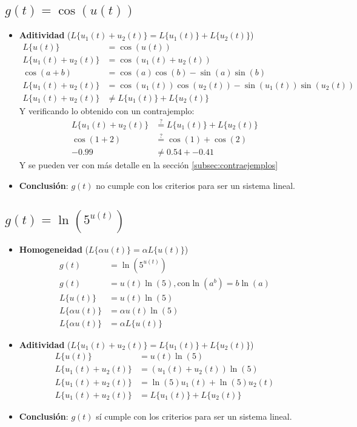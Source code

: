 \documentclass[12pt,a4paper]{article}
\begin{document}
\subsection{$g(t)=\cos(u(t))$}

\begin{itemize}
    \item \textbf{Aditividad} ($L\{u_1(t)+u_2(t)\}=L\{u_1(t)\}+ L\{u_2(t)\}$)
    \begin{align*}
        L\{u(t)\} &= \cos(u(t))\\
        L\{u_1(t)+u_2(t)\} &= \cos (u_1(t)+u_2(t))\\
        \cos(a+b) &= \cos(a)\cos(b)-\sin(a)\sin(b)\\
        L\{u_1(t)+u_2(t)\} &= \cos(u_1(t))\cos(u_2(t))-\sin(u_1(t))\sin(u_2(t))\\
        L\{u_1(t)+u_2(t)\} &\neq L\{u_1(t)\}+L\{u_2(t)\} 
    \end{align*}
    Y verificando lo obtenido con un contrajemplo:
    \begin{align*}
        L\{u_1(t)+u_2(t)\} &\stackrel{?}{=} L\{u_1(t)\}+ L\{u_2(t)\}\\
        \cos(1+2) &\stackrel{?}{=} \cos(1) + \cos(2)\\
         -0.99 &\neq 0.54 + -0.41
    \end{align*}
    Y se pueden ver con más detalle en la sección \ref{subsec:contraejemplos}
    \item \textbf{Conclusión}: $g(t)$ no cumple con los criterios para ser un sistema lineal.
\end{itemize}

\subsection{$g(t)=\ln(5^{u(t)})$}

\begin{itemize}
    \item \textbf{Homogeneidad} ($L\{\alpha u(t)\} = \alpha L\{u(t)\}$)
    \begin{align*}
        g(t)&=\ln(5^{u(t)})\\
        g(t) &= u(t)\ln(5), \text{con} \ln(a^b)=b\ln(a)\\
        L\{u(t)\} &= u(t)\ln(5)\\
        L\{\alpha u(t)\} &= \alpha u(t) \ln(5)\\
        L\{\alpha u(t)\} &= \alpha L\{u(t)\}
    \end{align*}
    \item \textbf{Aditividad} ($L\{u_1(t)+u_2(t)\}=L\{u_1(t)\}+ L\{u_2(t)\}$)
        \begin{align*}
        L\{u(t)\} &= u(t)\ln(5)\\
        L\{u_1(t)+u_2(t)\} &= (u_1(t)+u_2(t)) \ln(5)\\
        L\{u_1(t)+u_2(t)\} &= \ln(5)u_1(t)+\ln(5)u_2(t)\\
        L\{u_1(t)+u_2(t)\} &= L\{u_1(t)\}+L\{u_2(t)\}
    \end{align*}
    \item \textbf{Conclusión}: $g(t)$ sí cumple con los criterios para ser un sistema lineal.
\end{itemize}
\end{document}
